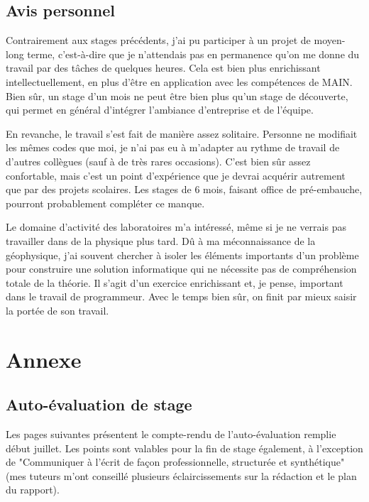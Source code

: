 \documentclass[12pt]{article}
\begin{document}
\subsection{Avis personnel}

    Contrairement aux stages précédents, j'ai pu participer à un projet de moyen-long terme, c'est-à-dire que je n'attendais pas en permanence qu'on me donne du travail par des tâches de quelques heures. Cela est bien plus enrichissant intellectuellement, en plus d'être en application avec les compétences de MAIN. Bien sûr, un stage d'un mois ne peut être bien plus qu'un stage de découverte, qui permet en général d'intégrer l'ambiance d'entreprise et de l'équipe.

    En revanche, le travail s'est fait de manière assez solitaire. Personne ne modifiait les mêmes codes que moi, je n'ai pas eu à m'adapter au rythme de travail de d'autres collègues (sauf à de très rares occasions). C'est bien sûr assez confortable, mais c'est un point d'expérience que je devrai acquérir autrement que par des projets scolaires. Les stages de 6 mois, faisant office de pré-embauche, pourront probablement compléter ce manque.

    Le domaine d'activité des laboratoires m'a intéressé, même si je ne verrais pas travailler dans de la physique plus tard. Dû à ma méconnaissance de la géophysique, j'ai souvent chercher à isoler les éléments importants d'un problème pour construire une solution informatique qui ne nécessite pas de compréhension totale de la théorie. Il s'agit d'un exercice enrichissant et, je pense, important dans le travail de programmeur. Avec le temps bien sûr, on finit par mieux saisir la portée de son travail.

    

\section{Annexe}
\subsection{Auto-évaluation de stage}

    Les pages suivantes présentent le compte-rendu de l'auto-évaluation remplie début juillet. Les points sont valables pour la fin de stage également, à l'exception de "Communiquer à l’écrit de façon professionnelle, structurée et synthétique" (mes tuteurs m'ont conseillé plusieurs éclaircissements sur la rédaction et le plan du rapport).
    
\end{document}
